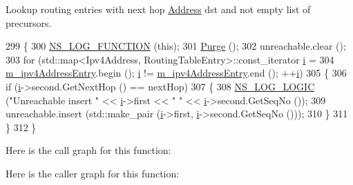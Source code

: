 Lookup routing entries with next hop \hyperlink{classns3_1_1Address}{Address} dst and not empty list of precursors. 


\begin{DoxyCode}
299 \{
300   \hyperlink{log-macros-disabled_8h_a90b90d5bad1f39cb1b64923ea94c0761}{NS\_LOG\_FUNCTION} (\textcolor{keyword}{this});
301   \hyperlink{classns3_1_1aodv_1_1RoutingTable_a2d0250f231e06733c06a43f5ec6a310b}{Purge} ();
302   unreachable.clear ();
303   \textcolor{keywordflow}{for} (std::map<Ipv4Address, RoutingTableEntry>::const\_iterator \hyperlink{bernuolliDistribution_8m_a6f6ccfcf58b31cb6412107d9d5281426}{i} =
304          \hyperlink{classns3_1_1aodv_1_1RoutingTable_adb33ba98f0792226c0f1ea7f260f3139}{m\_ipv4AddressEntry}.begin (); \hyperlink{bernuolliDistribution_8m_a6f6ccfcf58b31cb6412107d9d5281426}{i} != \hyperlink{classns3_1_1aodv_1_1RoutingTable_adb33ba98f0792226c0f1ea7f260f3139}{m\_ipv4AddressEntry}.end (); 
      ++\hyperlink{bernuolliDistribution_8m_a6f6ccfcf58b31cb6412107d9d5281426}{i})
305     \{
306       \textcolor{keywordflow}{if} (\hyperlink{bernuolliDistribution_8m_a6f6ccfcf58b31cb6412107d9d5281426}{i}->second.GetNextHop () == nextHop)
307         \{
308           \hyperlink{group__logging_ga88acd260151caf2db9c0fc84997f45ce}{NS\_LOG\_LOGIC} (\textcolor{stringliteral}{"Unreachable insert "} << \hyperlink{bernuolliDistribution_8m_a6f6ccfcf58b31cb6412107d9d5281426}{i}->first << \textcolor{stringliteral}{" "} << 
      \hyperlink{bernuolliDistribution_8m_a6f6ccfcf58b31cb6412107d9d5281426}{i}->second.GetSeqNo ());
309           unreachable.insert (std::make\_pair (\hyperlink{bernuolliDistribution_8m_a6f6ccfcf58b31cb6412107d9d5281426}{i}->first, \hyperlink{bernuolliDistribution_8m_a6f6ccfcf58b31cb6412107d9d5281426}{i}->second.GetSeqNo ()));
310         \}
311     \}
312 \}
\end{DoxyCode}


Here is the call graph for this function\+:




Here is the caller graph for this function\+:


